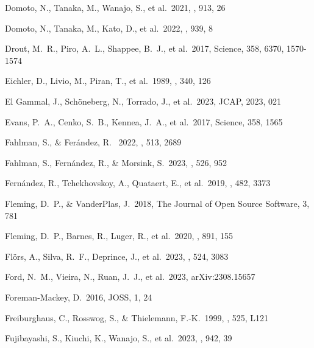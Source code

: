 \documentclass[twocolumn,twocolappendix]{aastex63}
\begin{document}
{{{{{{{{\begin{thebibliography}{}
 Domoto, N., Tanaka, M., Wanajo, S., et al.\ 2021, \apj, 913, 26


 Domoto, N., Tanaka, M., Kato, D., et al.\ 2022, \apj, 939, 8


 Drout, M.~R., Piro, A.~L., Shappee, B.~J., et al.\ 2017, Science, 358, 6370, 1570-1574


 Eichler, D., Livio, M., Piran, T., et al.\ 1989, \nat, 340, 126


 El Gammal, J., Sch{\"o}neberg, N., Torrado, J., et al.\ 2023, JCAP, 2023, 021


 Evans, P.~A., Cenko, S.~B., Kennea, J.~A., et al.\ 2017, Science, 358, 1565


 Fahlman, S., \& Fer\'andez, R. \ 2022, \mnras, 513, 2689


 Fahlman, S., Fern{\'a}ndez, R., \& Morsink, S.\ 2023, \mnras, 526, 952


 Fern{\'a}ndez, R., Tchekhovskoy, A., Quataert, E., et al.\ 2019, \mnras, 482, 3373


 Fleming, D.~P., \& VanderPlas, J.\ 2018, The Journal of Open Source Software, 3, 781


 Fleming, D.~P., Barnes, R., Luger, R., et al.\ 2020, \apj, 891, 155


 Fl{\"o}rs, A., Silva, R.~F., Deprince, J., et al.\ 2023, \mnras, 524, 3083


 Ford, N.~M., Vieira, N., Ruan, J.~J., et al.\ 2023, arXiv:2308.15657


 Foreman-Mackey, D.\ 2016, JOSS, 1, 24

 
 Freiburghaus, C., Rosswog, S., \& Thielemann, F.-K.\ 1999, \apjl, 525, L121


 Fujibayashi, S., Kiuchi, K., Wanajo, S., et al.\ 2023, \apj, 942, 39



\end{thebibliography}}}}}}}}}
\end{document}
